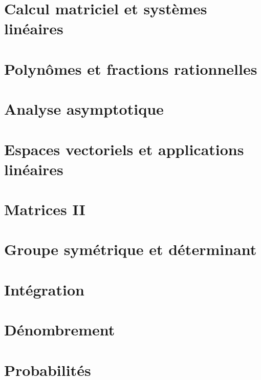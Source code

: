 \documentclass[a4paper, 10pt, twoside]{report}
\begin{document}
\chapter{Calcul matriciel et systèmes linéaires}

    
        
\chapter{Polynômes et fractions rationnelles}

    

\chapter{Analyse asymptotique}

    
        
\chapter{Espaces vectoriels et applications linéaires}

    

\chapter{Matrices II}

    
    
\chapter{Groupe symétrique et déterminant}

    
        
\chapter{Intégration}

    

\chapter{Dénombrement}

    
        
\chapter{Probabilités}
\end{document}
